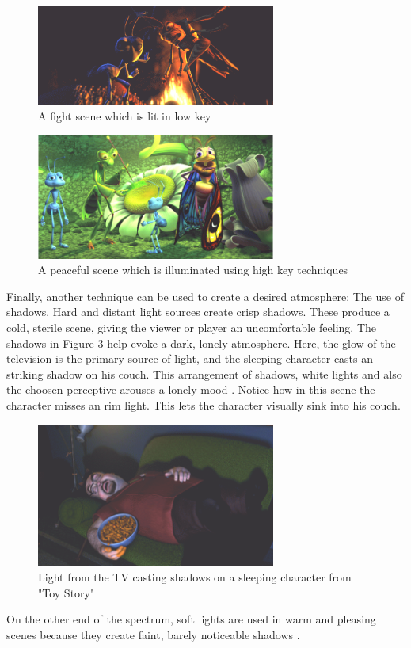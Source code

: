 \begin{figure}[H]
	\centering
		\includegraphics[width=0.7\textwidth]{Bilder/flickvshopper.PNG}
	\caption{A fight scene which is lit in low key \cite{bugslife}}
	\label{fig:flickvshopper}
\end{figure}

\begin{figure}[H]
	\centering
		\includegraphics[width=0.7\textwidth]{Bilder/friedlich.PNG}
	\caption{A peaceful scene which is illuminated using high key techniques \cite{bugslife}}
	\label{fig:friedlich}
\end{figure}

Finally, another technique can be used to create a desired atmosphere: The use of shadows. Hard and distant light sources create crisp shadows. These produce a cold, sterile scene, giving the viewer or player an uncomfortable feeling. The shadows in Figure \ref{fig:sleeping} help evoke a dark, lonely atmosphere. Here, the glow of the television is the primary source of light, and the sleeping character casts an striking shadow on his couch. This arrangement of shadows, white lights and also the choosen perceptive arouses a lonely mood \cite{sudeep}. 
Notice how in this scene the character misses an rim light. This lets the character visually sink into his couch. 
\begin{figure}[H]
	\centering
		\includegraphics[width=0.7\textwidth]{Bilder/sleeping.PNG}
	\caption{Light from the TV casting shadows on a sleeping character from "Toy Story" \cite{toystory}}
	\label{fig:sleeping}
\end{figure}



On the other end of the spectrum, soft lights are used in warm and pleasing scenes because they create faint, barely noticeable  shadows \cite{Shadowplay} \cite{sudeep}.